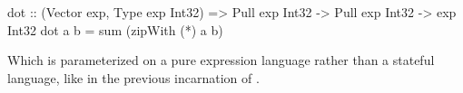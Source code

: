 \documentclass[../main.tex]{subfiles}
\begin{document}
\begin{code}
dot :: (Vector exp, Type exp Int32) => Pull exp Int32 -> Pull exp Int32
    -> exp Int32
dot a b = sum (zipWith (*) a b)
\end{code}

\noindent Which is parameterized on a pure expression language  rather than a stateful language, like  in the previous incarnation of .






\end{document}
